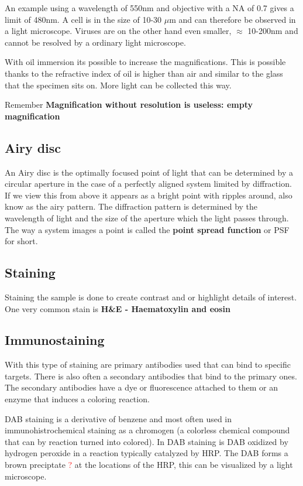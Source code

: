	An example using a wavelength of 550nm and objective with a NA of 0.7 gives a limit of 480nm. A cell is in the size of 10-30 $\mu$m and can therefore be observed in a light microscope. Viruses are on the other hand even smaller, $\approx$ 10-200nm and cannot be resolved by a ordinary light microscope. 

	With oil immersion its possible to increase the magnifications. This is possible thanks to the refractive index of oil is higher than air and similar to the glass that the specimen sits on. More light can be collected this way. 

	\begin{wbox}{Remember}
		  \textbf{Magnification without resolution is useless: empty magnification}
	\end{wbox}
	
	\subsection{Airy disc}
	An Airy disc is the optimally focused point of light that can be determined by a circular aperture in the case of a perfectly aligned system limited by diffraction. If we view this from above it appears as a bright point with ripples around, also know as the airy pattern. The diffraction pattern is determined by the wavelength of light and the size of the aperture which the light passes through. The way a system images a point is called the \textbf{point spread function} or PSF for short. 

	\subsection{Staining}
	Staining the sample is done to create contrast and or highlight details of interest. One very common stain is \textbf{H\&E - Haematoxylin and eosin} 

	\subsection{Immunostaining}
	With this type of staining are primary antibodies used that can bind to specific targets. There is also often a secondary antibodies that bind to the primary ones. The secondary antibodies have a dye or fluorescence attached to them or an enzyme that induces a coloring reaction. 

	DAB staining is a derivative of benzene and most often used in immunohistrochemical staining as a chromogen (a colorless chemical compound that can by reaction turned into colored). In DAB staining is DAB oxidized by hydrogen peroxide in a reaction typically catalyzed by HRP. The DAB forms a brown preciptate \textcolor{red}{?} at the locations of the HRP, this can be visualized by a light microscope. 

